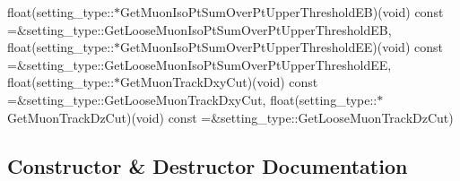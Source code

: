 \begin{DoxyCompactItemize}
float(setting\_\-type::$\ast$GetMuonIsoPtSumOverPtUpperThresholdEB)(void) const =\&setting\_\-type::GetLooseMuonIsoPtSumOverPtUpperThresholdEB, float(setting\_\-type::$\ast$GetMuonIsoPtSumOverPtUpperThresholdEE)(void) const =\&setting\_\-type::GetLooseMuonIsoPtSumOverPtUpperThresholdEE, float(setting\_\-type::$\ast$GetMuonTrackDxyCut)(void) const =\&setting\_\-type::GetLooseMuonTrackDxyCut, float(setting\_\-type::$\ast$GetMuonTrackDzCut)(void) const =\&setting\_\-type::GetLooseMuonTrackDzCut)
\end{DoxyCompactItemize}


\subsection{Constructor \& Destructor Documentation}
\hypertarget{classHttValidLooseMuonsProducer_aad92720a3c5d251a0e6a5d8737285963}{
}
